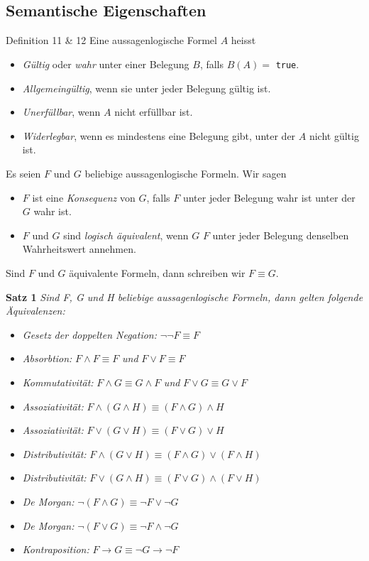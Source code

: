 \subsection{Semantische Eigenschaften}
\begin{definition}{Definition 11 \& 12}
	Eine aussagenlogische Formel $A$ heisst
	\begin{itemize}
		\item \textit{Gültig} oder \textit{wahr} unter einer Belegung $B$, falls $\hat{B}(A)=$
			\texttt{true}.
		\item \textit{Allgemeingültig}, wenn sie unter jeder Belegung gültig ist.
		\item \textit{Unerfüllbar}, wenn $A$ nicht erfüllbar ist.
		\item \textit{Widerlegbar}, wenn es mindestens eine Belegung gibt, unter der $A$ nicht gültig
			ist.
	\end{itemize}
	Es seien $F$ und $G$ beliebige aussagenlogische Formeln. Wir sagen
	\begin{itemize}
		\item $F$ ist eine \textit{Konsequenz} von $G$, falls $F$ unter jeder Belegung wahr ist unter der $G$ wahr
			ist.
		\item $F$ und $G$ sind \textit{logisch äquivalent}, wenn $G$ $F$ unter jeder Belegung denselben
			Wahrheitswert annehmen.
	\end{itemize}
	Sind $F$ und $G$ äquivalente Formeln, dann schreiben wir $F\equiv G$.
\end{definition}

\textbf{Satz 1} \textit{Sind F, G und H beliebige aussagenlogische Formeln, dann gelten folgende Äquivalenzen:}
\begin{itemize}
	\item \textit{Gesetz der doppelten Negation: } $\neg\neg F \equiv F$
	\item \textit{Absorbtion: } $F \land F  \equiv F$ \textit{ und } $F \lor  F \equiv F$
	\item \textit{Kommutativität: } $F \land G \equiv G \land F$ \textit{ und } $F \lor G \equiv G \lor F$
	\item \textit{Assoziativität: } $F \land (G \land H) \equiv (F \land G) \land H$
	\item \textit{Assoziativität: } $F \lor (G \lor H) \equiv (F \lor G) \lor H$
	\item \textit{Distributivität: } $F \land (G \lor H) \equiv (F \land G) \lor (F \land H)$
	\item \textit{Distributivität: } $F \lor (G \land H) \equiv (F \lor G) \land (F \lor H)$
	\item \textit{De Morgan: } $\neg(F \land G) \equiv \neg F \lor \neg G$
	\item \textit{De Morgan: } $\neg (F \lor G) \equiv \neg F \land \neg G$
	\item \textit{Kontraposition: } $F \rightarrow G \equiv \neg G \rightarrow \neg F$ 
\end{itemize}

